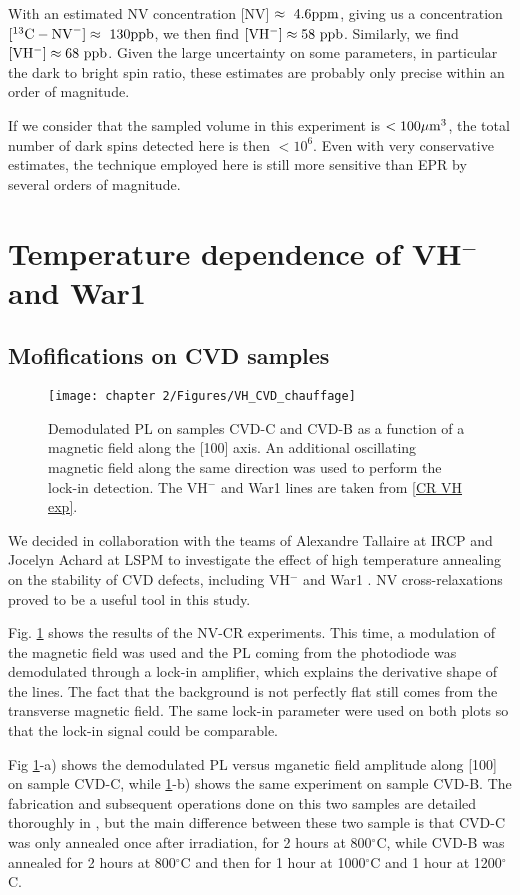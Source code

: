 \documentclass[a4paper, 11pt]{report}
\begin{document}
With an estimated NV concentration [NV] $\approx\ \rm 4.6 ppm$, giving us a concentration $[^{13}\rm{C-NV}^-]\approx \ \rm 130 ppb$, we then find $[\rm VH^-] \approx 58\ \rm ppb$. Similarly, we find $[\rm VH^-] \approx 68\ \rm ppb$. Given the large uncertainty on some parameters, in particular the dark to bright spin ratio, these estimates are probably only precise within an order of magnitude.

If we consider that the sampled volume in this experiment is $< 100 \mu \rm{m}^3$, the total number of dark spins detected here is then $< 10^6$. Even with very conservative estimates, the technique employed here is still more sensitive than EPR by several orders of magnitude.

\section{Temperature dependence of VH$^-$ and War1}


\subsection{Mofifications on CVD samples}
\begin{figure}[h]
\centering
\texttt{[image: chapter 2/Figures/VH\_CVD\_chauffage]}
\caption{Demodulated PL on samples CVD-C and CVD-B as a function of a magnetic field along the [100] axis. An additional oscillating magnetic field along the same direction was used to perform the lock-in detection. The VH$^-$ and War1 lines are taken from \ref{CR VH exp}.}
\label{chauffage CVD}
\end{figure}

We decided in collaboration with the teams of Alexandre Tallaire at IRCP and Jocelyn Achard at LSPM to investigate the effect of high temperature annealing on the stability of CVD defects, including VH$^-$ and War1 \citep{ngambou2022improving}. NV cross-relaxations proved to be a useful tool in this study.

Fig. \ref{chauffage CVD} shows the results of the NV-CR experiments. This time, a modulation of the magnetic field was used and the PL coming from the photodiode was demodulated through a lock-in amplifier, which explains the derivative shape of the lines. The fact that the background is not perfectly flat still comes from the transverse magnetic field. The same lock-in parameter were used on both plots so that the lock-in signal could be comparable.

Fig \ref{chauffage CVD}-a) shows the demodulated PL versus mganetic field amplitude along [100] on sample CVD-C, while \ref{chauffage CVD}-b) shows the same experiment on sample CVD-B. The fabrication and subsequent operations done on this two samples are detailed thoroughly in \citep{ngambou2022improving}, but the main difference between these two sample is that CVD-C was only annealed once after irradiation, for 2 hours at 800$^\circ$C, while CVD-B was annealed for 2 hours at 800$^\circ$C and then for 1 hour at 1000$^\circ$C and 1 hour at 1200$^\circ$C.
\end{document}
